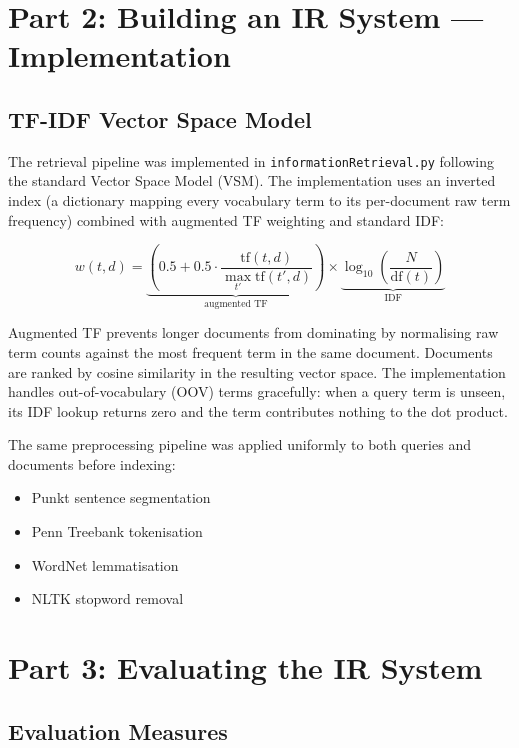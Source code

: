 \documentclass{article}
\begin{document}
\section{Part 2: Building an IR System — Implementation}

\subsection{TF-IDF Vector Space Model}

The retrieval pipeline was implemented in \texttt{informationRetrieval.py} following the standard Vector Space Model (VSM). The implementation uses an inverted index (a dictionary mapping every vocabulary term to its per-document raw term frequency) combined with augmented TF weighting and standard IDF:

\[
w(t, d) = \underbrace{\left(0.5 + 0.5 \cdot \frac{\mathrm{tf}(t,d)}{\max_{t'}\mathrm{tf}(t',d)}\right)}_{\text{augmented TF}} \times \underbrace{\log_{10}\!\left(\frac{N}{\mathrm{df}(t)}\right)}_{\text{IDF}}
\]

Augmented TF prevents longer documents from dominating by normalising raw term counts against the most frequent term in the same document. Documents are ranked by cosine similarity in the resulting vector space. The implementation handles out-of-vocabulary (OOV) terms gracefully: when a query term is unseen, its IDF lookup returns zero and the term contributes nothing to the dot product.

The same preprocessing pipeline was applied uniformly to both queries and documents before indexing:
\begin{itemize}[noitemsep]
    \item Punkt sentence segmentation
    \item Penn Treebank tokenisation
    \item WordNet lemmatisation
    \item NLTK stopword removal
\end{itemize}

\section{Part 3: Evaluating the IR System}

\subsection{Evaluation Measures}
\end{document}
